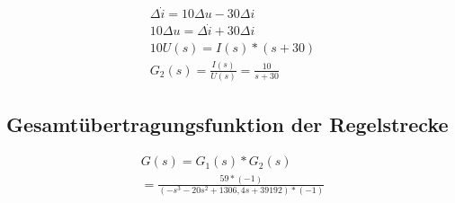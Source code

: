 \documentclass[10pt,a4paper]{article}
\begin{document}
\begin{figure}[H]
  \begin{align}
	  \Delta\dot{i} = 10 \Delta u -30 \Delta i \nonumber \\
	  10 \Delta u = \Delta \dot{i} + 30 \Delta i \nonumber \\
	  10 U(s) = I(s) * (s + 30) \nonumber \\
	  G_2(s) = \frac{I(s)}{U(s)} = \frac{10}{s + 30} \nonumber
  \end{align}
\end{figure}



\subsection{Gesamtübertragungsfunktion der Regelstrecke}
\begin{figure}[H]
  \begin{align}
	  G(s) = G_1(s) * G_2(s) \nonumber \\
	  = \frac{59 * (-1)}{(-s^3 -20s^2 + 1306,4s + 39192) * (-1)} \nonumber
  \end{align}
\end{figure}
\end{document}
